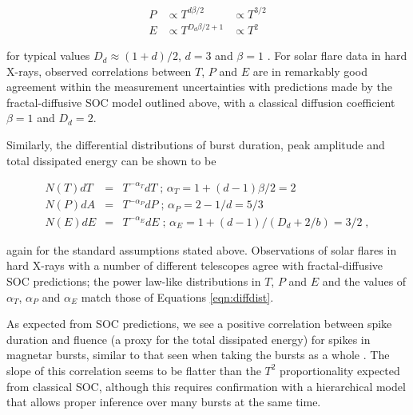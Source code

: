 \documentclass[12pt]{emulateapj}
\begin{document}
\begin{eqnarray}
P & \propto  T^{d\beta/2} &\propto  T^{3/2} \\ 
E &\propto   T^{D_d\beta/2 + 1} & \propto  T^{2} 
\end{eqnarray}

for typical values $D_d \approx (1+d)/2$, $d = 3$  and  $\beta = 1$ \citep[see ][ and references therein for details of the derivation]{aschwanden2014}. 
For solar flare data in hard X-rays, observed correlations between $T$, $P$ and $E$ are in remarkably good agreement within the measurement
uncertainties with predictions made by the fractal-diffusive SOC model outlined above, with a classical diffusion coefficient $\beta = 1$ and $D_d = 2$.

Similarly, the differential distributions of burst duration, peak amplitude and total dissipated energy can be shown to be

\begin{eqnarray}
N(T) dT &=& T^{-\alpha_T}dT \;  \mbox{; $\alpha_T = 1 + (d-1)\beta/2$} = 2\nonumber \\ 
N(P) dA &=& T^{-\alpha_P}dP \; \mbox{; $\alpha_P = 2 - 1/d$} = 5/3 \\
N(E) dE & = &T^{-\alpha_E}dE  \;\mbox{; $\alpha_E = 1 + (d-1)/(D_d + 2/b)$} =  3/2 \; ,  \nonumber
\label{eqn:diffdist}
\end{eqnarray}

again for the standard assumptions stated above. Observations of solar flares in hard X-rays with a number of different telescopes
agree with fractal-diffusive SOC predictions; the power law-like distributions in $T$, $P$ and $E$ and the values of $\alpha_T$, $\alpha_P$
and $\alpha_E$ match those of Equations \ref{eqn:diffdist}.

As expected from SOC predictions, we see a positive correlation between spike duration and 
fluence (a proxy for the total dissipated energy) for spikes in magnetar bursts, similar to that seen when taking the bursts as a whole \citep{gogus1999}. 
The slope of this correlation seems to be flatter than the $T^{2}$ proportionality
expected from classical SOC, although this requires confirmation with a hierarchical model that allows proper inference over many
bursts at the same time.  
\end{document}
